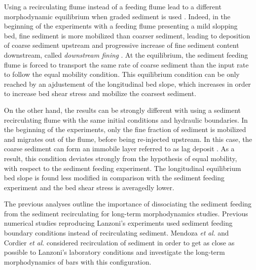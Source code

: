 Using a recirculating flume instead of a feeding flume lead to a different morphodynamic equilibrium when graded sediment is used \cite{Parker1993,Wilcock1993,Bettess1995,Wilcock2003,Kleinhans2004}.
Indeed, in the beginning of the experiments with a feeding flume presenting a mild slopping bed, fine sediment is more mobilized than coarser sediment, leading to deposition of coarse sediment upstream and progressive increase of fine sediment content downstream, called {\it downstream fining} \cite{Hoey1994,Seal1997,ToroEscobar2000}. At the equilibrium, the sediment feeding flume is forced to transport the same rate of coarse sediment than the input rate to follow the equal mobility condition. This equilibrium condition can be only reached by an ajdustement of the longitudinal bed slope, which increases in order to increase bed shear stress and mobilize the coarsest sediment.

On the other hand, the results can be strongly different with using a sediment recirculating flume with the same initial conditions and hydraulic boundaries. In the beginning of the experiments, only the fine fraction of sediment is mobilized and migrates out of the flume, before being re-injected upstream.
In this case, the coarse sediment can form an immobile layer referred to as lag deposit \cite{Kleinhans2004}. As a result, this condition deviates strongly from the hypothesis of equal mobility, with respect to the sediment feeding experiment. The longitudinal equilibrium bed slope is found less modified in comparison with the sediment feeding experiment and the bed shear stress is averagedly lower.

The previous analyses outline the importance of dissociating the sediment feeding from the sediment recirculating for long-term morphodynamics studies. Previous numerical studies reproducing \cite{Defina2003,Qian2016} Lanzoni's experiments used sediment feeding boundary conditions instead of recirculating sediment. Mendoza {\it et al.} \cite{Mendoza2016} and Cordier {\it et al.} \cite{Cordier2017} considered recirculation of sediment in order to get as close as possible to Lanzoni's laboratory conditions and investigate the long-term morphodynamics of bars with this configuration.

